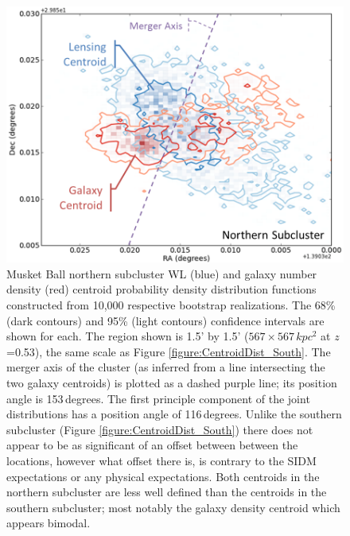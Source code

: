 \begin{figure}
\centering
\includegraphics[width=5in]{Chapter4/AnalysisFiles/northcentroids_histplot2d_reformat.png}
\caption[Musket Ball northern subcluster galaxy and weak lensing centroid spatial distribution.]{
Musket Ball northern subcluster WL (blue) and galaxy number density (red) centroid probability density distribution functions constructed from 10,000 respective bootstrap realizations.
The 68\% (dark contours) and 95\% (light contours) confidence intervals are shown for each.
The region shown is 1.5' by 1.5' ($567\times 567\,kpc^2$ at $z$=0.53), the same scale as Figure \ref{figure:CentroidDist_South}.
The merger axis of the cluster (as inferred from a line intersecting the two galaxy centroids) is plotted as a dashed purple line; its position angle is 153\,degrees.
The first principle component of the joint distributions has a position angle of 116\,degrees.
Unlike the southern subcluster (Figure \ref{figure:CentroidDist_South}) there does not appear to be as significant of an offset between between the locations, however what offset there is, is contrary to the SIDM expectations or any physical expectations.
Both centroids in the northern subcluster are less well defined than the centroids in the southern subcluster; most notably the galaxy density centroid which appears bimodal.
}
\label{figure:CentroidDist_North}
\end{figure}

